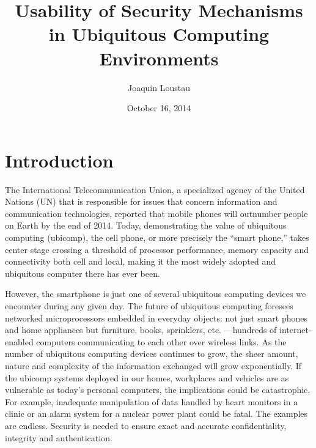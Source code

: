 \documentclass{article}
\title{Usability of Security Mechanisms in Ubiquitous Computing Environments}
\author{Joaquin Loustau}
\date{October 16, 2014}
\begin{document}
\maketitle


\pagebreak
\tableofcontents

\pagebreak

%
%
\section{Introduction}
\label{introduction}
The International Telecommunication Union, a specialized agency of the United Nations (UN) that is responsible for issues that concern information and communication technologies, reported that mobile phones will outnumber people on Earth by the end of 2014. \cite{} Today, demonstrating the value of ubiquitous computing (ubicomp), the cell phone, or more precisely the “smart phone,” takes center stage crossing a threshold of processor performance, memory capacity and connectivity both cell and local, making it the most widely adopted and ubiquitous computer there has ever been. 

However, the smartphone is just one of several ubiquitous computing devices we encounter during any given day. The future of ubiquitous computing foresees networked microprocessors embedded in everyday objects: not just smart phones and home appliances but furniture, books, sprinklers, etc. ---hundreds of internet-enabled computers communicating to each other over wireless links. 
As the number of ubiquitous computing devices continues to grow, the sheer amount, nature and complexity of the information exchanged will grow exponentially. If the ubicomp systems deployed in our homes, workplaces and vehicles are as vulnerable as today’s personal computers, the implications could be catastrophic. For example, inadequate manipulation of data handled by heart monitors in a clinic or an alarm system for a nuclear power plant could be fatal. The examples are endless. Security is needed to ensure exact and accurate confidentiality, integrity and authentication.
\end{document}
